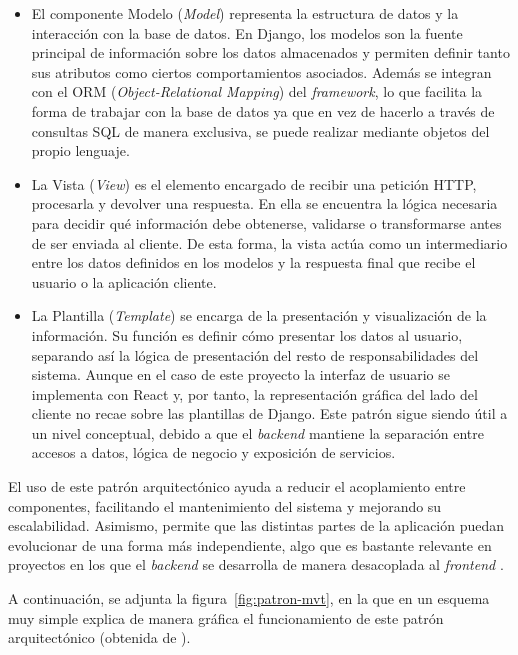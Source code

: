 \begin{itemize}
	\item El componente Modelo (\textit{Model}) representa la estructura de datos y la interacción con la base de datos. En Django, los modelos son la fuente principal de información sobre los datos almacenados y permiten definir tanto sus atributos como ciertos comportamientos asociados. Además se integran con el ORM (\textit{Object-Relational Mapping}) del \textit{framework}, lo que facilita la forma de trabajar con la base de datos ya que en vez de hacerlo a través de consultas SQL de manera exclusiva, se puede realizar mediante objetos del propio lenguaje.
	\item La Vista (\textit{View}) es el elemento encargado de recibir una petición HTTP, procesarla y devolver una respuesta. En ella se encuentra la lógica necesaria para decidir qué información debe obtenerse, validarse o transformarse antes de ser enviada al cliente. De esta forma, la vista actúa como un intermediario entre los datos definidos en los modelos y la respuesta final que recibe el usuario o la aplicación cliente.
	\item La Plantilla (\textit{Template}) se encarga de la presentación y visualización de la información. Su función es definir cómo presentar los datos al usuario, separando así la lógica de presentación del resto de responsabilidades del sistema. Aunque en el caso de este proyecto la interfaz de usuario se implementa con React y, por tanto, la representación gráfica del lado del cliente no recae sobre las plantillas de Django. Este patrón sigue siendo útil a un nivel conceptual, debido a que el \textit{backend} mantiene la separación entre accesos a datos, lógica de negocio y exposición de servicios.
\end{itemize}

El uso de este patrón arquitectónico ayuda a reducir el acoplamiento entre componentes, facilitando el mantenimiento del sistema y mejorando su escalabilidad. Asimismo, permite que las distintas partes de la aplicación puedan evolucionar de una forma más independiente, algo que es bastante relevante en proyectos en los que el \textit{backend} se desarrolla de manera desacoplada al \textit{frontend} \cite{modeloArquitectonicoDjango}.

A continuación, se adjunta la figura~\ref{fig:patron-mvt}, en la que en un esquema muy simple explica de manera gráfica el funcionamiento de este patrón arquitectónico (obtenida de \cite{mvt:geek}).


